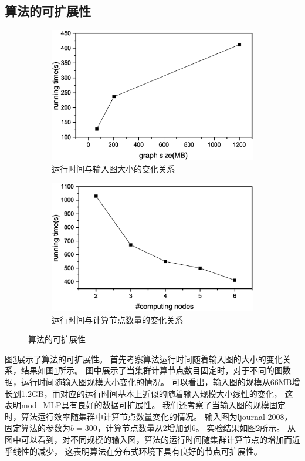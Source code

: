 \documentclass[master]{njuthesis}
\begin{document}
\subsection{算法的可扩展性}
\begin{figure}[t]
\centering
\begin{subfigure}[b]{0.48\textwidth}
	\center
	\includegraphics[width=1\textwidth]{figure/data_scala.eps}
	\caption{运行时间与输入图大小的变化关系}
	\label{fig:ch2:data_scalabity}
\end{subfigure}
\begin{subfigure}[b]{0.48\textwidth}
	\centering
	\includegraphics[width=1\textwidth]{figure/node_scalabity.eps}
	\caption{运行时间与计算节点数量的变化关系}
	\label{fig:ch2:node_scalabity}
\end{subfigure}
\caption{算法的可扩展性}
\label{fig:scalabityyy}
\end{figure}
图\ref{fig:scalabityyy}展示了算法的可扩展性。
首先考察算法运行时间随着输入图的大小的变化关系，结果如图\ref{fig:ch2:data_scalabity}所示。
图中展示了当集群计算节点数目固定时，对于不同的图数据，运行时间随输入图规模大小变化的情况。 
可以看出，输入图的规模从66MB增长到1.2GB，而对应的运行时间基本上近似的随着输入规模大小线性的变化，
这表明mod\string_MLP具有良好的数据可扩展性。
我们还考察了当输入图的规模固定时，算法运行效率随集群中计算节点数量变化的情况。
输入图为ljournal-2008，固定算法的参数为$b=300$，计算节点数量从2增加到6。
实验结果如图\ref{fig:ch2:node_scalabity}所示。
从图中可以看到，对不同规模的输入图，算法的运行时间随集群计算节点的增加而近乎线性的减少，
这表明算法在分布式环境下具有良好的节点可扩展性。
\end{document}
